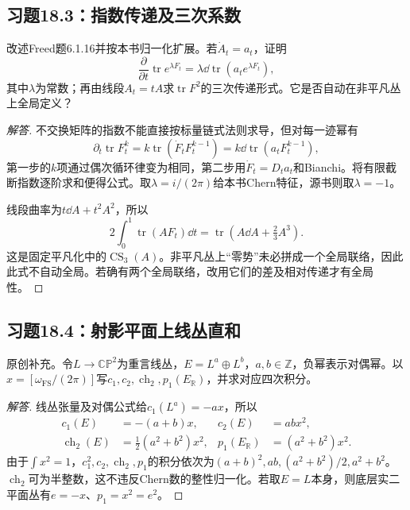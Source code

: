 \subsection*{习题18.3：指数传递及三次系数}
改述Freed题6.1.16并按本书归一化扩展。若$\dot A_t=a_t$，证明
\[
 \frac{\partial}{\partial t}\operatorname{tr}e^{\lambda F_t}
 =\lambda\dd\operatorname{tr}(a_t e^{\lambda F_t}),
\]
其中$\lambda$为常数；再由线段$A_t=tA$求$\operatorname{tr}F^2$的三次传递形式。它是否自动在非平凡丛上全局定义？
\begin{proof}[解答]
不交换矩阵的指数不能直接按标量链式法则求导，但对每一迹幂有
\[
 \partial_t\operatorname{tr}F_t^k
 =k\operatorname{tr}(\dot F_tF_t^{k-1})
 =k\dd\operatorname{tr}(a_tF_t^{k-1}),
\]
第一步的$k$项通过偶次循环律变为相同，第二步用$\dot F_t=D_ta_t$和Bianchi。将有限截断指数逐阶求和便得公式。取$\lambda=i/(2\pi)$给本书Chern特征，源书则取$\lambda=-1$。

线段曲率为$t\dd A+t^2A^2$，所以
\[
 2\int_0^1\operatorname{tr}(A F_t)\dd t
 =\operatorname{tr}(A\dd A+\tfrac23A^3).
\]
这是固定平凡化中的$\operatorname{CS}_3(A)$。非平凡丛上“零势”未必拼成一个全局联络，因此此式不自动全局。若确有两个全局联络，改用它们的差及相对传递才有全局性。
\end{proof}

\subsection*{习题18.4：射影平面上线丛直和}
原创补充。令$L\to\mathbb{CP}^2$为重言线丛，$E=L^a\oplus L^b$，$a,b\in\mathbb Z$，负幂表示对偶幂。以$x=[\omega_{\mathrm{FS}}/(2\pi)]$写$c_1,c_2,\operatorname{ch}_2,p_1(E_{\mathbb R})$，并求对应四次积分。
\begin{proof}[解答]
线丛张量及对偶公式给$c_1(L^a)=-ax$，所以
\begin{align*}
 c_1(E)&=-(a+b)x,& c_2(E)&=abx^2,\\
 \operatorname{ch}_2(E)&=\tfrac12(a^2+b^2)x^2,&
 p_1(E_{\mathbb R})&=(a^2+b^2)x^2.
\end{align*}
由于$\int x^2=1$，$c_1^2,c_2,\operatorname{ch}_2,p_1$的积分依次为$(a+b)^2,ab,(a^2+b^2)/2,a^2+b^2$。$\operatorname{ch}_2$可为半整数，这不违反Chern数的整性归一化。若取$E=L$本身，则底层实二平面丛有$e=-x$、$p_1=x^2=e^2$。
\end{proof}

